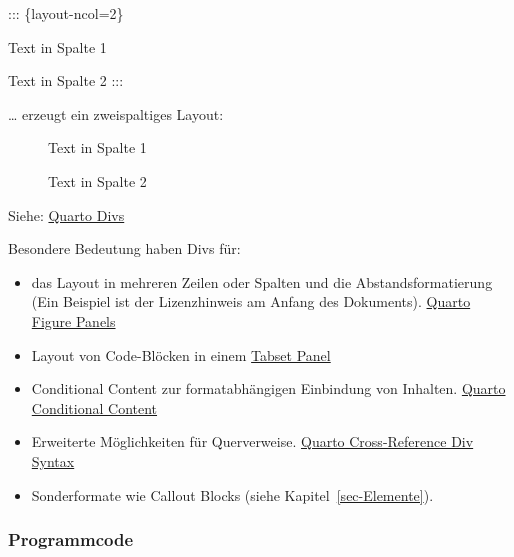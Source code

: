 \documentclass[
  letterpaper,
  DIV=11]{scrartcl}
\newenvironment{Shaded}{\begin{snugshade}}{\end{snugshade}}
\newcommand{\NormalTok}[1]{\textcolor[rgb]{0.00,0.23,0.31}{#1}}
\begin{document}
\begin{Shaded}
\begin{Highlighting}[]
\NormalTok{::: \{layout{-}ncol=2\}}

\NormalTok{Text in Spalte 1}

\NormalTok{Text in Spalte 2}
\NormalTok{:::}
\end{Highlighting}
\end{Shaded}

\ldots{} erzeugt ein zweispaltiges Layout:

\begin{figure}

\begin{minipage}{0.50\linewidth}
Text in Spalte 1\end{minipage}%
%
\begin{minipage}{0.50\linewidth}
Text in Spalte 2\end{minipage}%

\end{figure}%

Siehe:
\href{https://quarto.org/docs/authoring/markdown-basics.html\#divs-and-spans}{Quarto
Divs}

Besondere Bedeutung haben Divs für:

\begin{itemize}
\item
  das Layout in mehreren Zeilen oder Spalten und die
  Abstandsformatierung (Ein Beispiel ist der Lizenzhinweis am Anfang des
  Dokuments).
  \href{https://quarto.org/docs/authoring/figures.html\#figure-panels}{Quarto
  Figure Panels}
\item
  Layout von Code-Blöcken in einem
  \href{https://quarto.org/docs/interactive/layout.html\#tabset-panel}{Tabset
  Panel}
\item
  Conditional Content zur formatabhängigen Einbindung von Inhalten.
  \href{https://quarto.org/docs/authoring/conditional.html}{Quarto
  Conditional Content}
\item
  Erweiterte Möglichkeiten für Querverweise.
  \href{https://quarto.org/docs/authoring/cross-references-divs.html}{Quarto
  Cross-Reference Div Syntax}
\item
  Sonderformate wie Callout Blocks (siehe Kapitel~\ref{sec-Elemente}).
\end{itemize}

\subsubsection{Programmcode}\label{programmcode}
\end{document}
